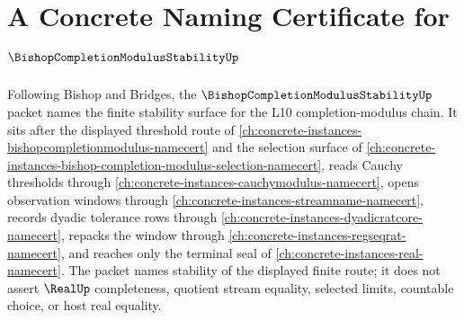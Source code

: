 \chapter{A Concrete Naming Certificate for $\BishopCompletionModulusStabilityUp$}
\label{ch:concrete-instances-bishop-completion-modulus-stability-namecert}

Following Bishop and Bridges, the $\BishopCompletionModulusStabilityUp$ packet names the finite stability surface for the L10 completion-modulus chain. It sits after the displayed threshold route of \autoref{ch:concrete-instances-bishopcompletionmodulus-namecert} and the selection surface of \autoref{ch:concrete-instances-bishop-completion-modulus-selection-namecert}, reads Cauchy thresholds through \autoref{ch:concrete-instances-cauchymodulus-namecert}, opens observation windows through \autoref{ch:concrete-instances-streamname-namecert}, records dyadic tolerance rows through \autoref{ch:concrete-instances-dyadicratcore-namecert}, repacks the window through \autoref{ch:concrete-instances-regseqrat-namecert}, and reaches only the terminal seal of \autoref{ch:concrete-instances-real-namecert}. The packet names stability of the displayed finite route; it does not assert $\RealUp$ completeness, quotient stream equality, selected limits, countable choice, or host real equality.

